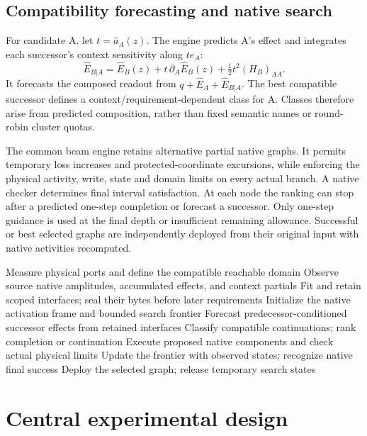 \documentclass[11pt]{article}
\begin{document}
\subsection{Compatibility forecasting and native search}
For candidate A, let $t=\widehat a_A(z)$. The engine predicts A's effect and
integrates each successor's context sensitivity along $te_A$:
\[
 \widehat E_{B|A}
 =\widehat E_B(z)+t\,\partial_A\widehat E_B(z)
       +\tfrac12t^2(H_B)_{AA}.
\]
It forecasts the composed readout from
$q+\widehat E_A+\widehat E_{B|A}$. The best compatible successor defines a
context/requirement-dependent class for A. Classes therefore arise from
predicted composition, rather than fixed semantic names or round-robin
cluster quotas.

The common beam engine retains alternative partial native graphs. It permits
temporary loss increases and protected-coordinate excursions, while enforcing
the physical activity, write, state and domain limits on every actual branch.
A native checker determines final interval satisfaction. At each node the
ranking can stop after a predicted one-step completion or forecast a successor.
Only one-step guidance is used at the final depth or insufficient remaining
allowance. Successful or best selected graphs are independently deployed from
their original input with native activities recomputed.

\begin{algorithm}[t]
\caption{Acquire, classify, construct, and deploy}
\begin{algorithmic}[1]
\State Measure physical ports and define the compatible reachable domain
\State Observe source native amplitudes, accumulated effects, and context partials
\State Fit and retain scoped interfaces; seal their bytes before later requirements
 \State Initialize the native activation frame and bounded search frontier
  \State Forecast predecessor-conditioned successor effects from retained interfaces
  \State Classify compatible continuations; rank completion or continuation
  \State Execute proposed native components and check actual physical limits
  \State Update the frontier with observed states; recognize native final success
 \EndWhile
 \State Deploy the selected graph; release temporary search states
\EndFor
\end{algorithmic}
\end{algorithm}

\section{Central experimental design}
\end{document}
